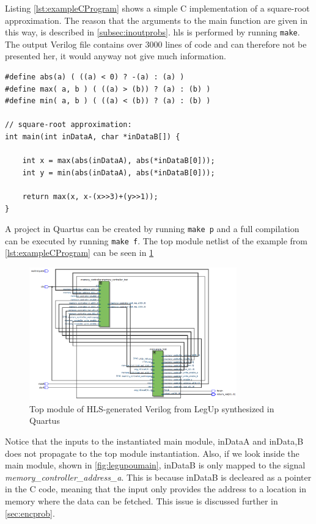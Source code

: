 \noindent
Listing \ref{lst:exampleCProgram} shows a simple C implementation of a square-root approximation. The reason that the arguments to the main function are given in this way, is described in \cref{subsec:inoutprobs}. \gls{hls} is performed by running \verb!make!. The output Verilog file contains over 3000 lines of code and can therefore not be presented her, it would anyway not give much information.
\begin{lstlisting}[caption={Useless code},label=lst:exampleCProgram]
#define abs(a) ( ((a) < 0) ? -(a) : (a) )
#define max( a, b ) ( ((a) > (b)) ? (a) : (b) )
#define min( a, b ) ( ((a) < (b)) ? (a) : (b) )

// square-root approximation:
int main(int inDataA, char *inDataB[]) {

    int x = max(abs(inDataA), abs(*inDataB[0]));
    int y = min(abs(inDataA), abs(*inDataB[0]));

    return max(x, x-(x>>3)+(y>>1));
}
\end{lstlisting}
\noindent
A project in Quartus can be created by running \verb!make p! and a full compilation can be executed by running \verb!make f!. The top module netlist of the example from \cref{lst:exampleCProgram} can be seen in \cref{fig:legupouttop}
\begin{figure}[hbpt]
\centering
\includegraphics[width=0.8\textwidth]{../figs/LegUpOutputTop.png}
\caption{\label{fig:legupouttop}Top module of HLS-generated Verilog from LegUp synthesized in Quartus}
\end{figure}
Notice that the inputs to the instantiated main module, inDataA and inData,B does not propagate to the top module instantiation. Also, if we look inside the main module, shown in \cref{fig:legupoumain}, inDataB is only mapped to the signal \textit{memory\_controller\_address\_a}. This is because inDataB is decleared as a pointer in the C code, meaning that the input only provides the address to a location in memory where the data can be fetched. This issue is discussed further in \cref{sec:encprob}.

